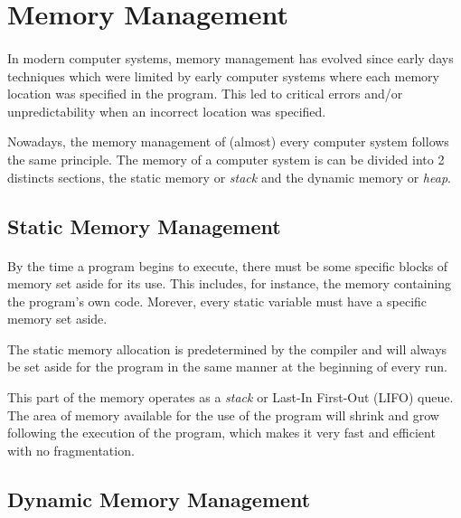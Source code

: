 \section{Memory Management}





\paragraph{}
In modern computer systems, memory management has evolved since early days techniques which were limited
    by early computer systems where each memory location was specified in the program.
This led to critical errors and/or unpredictability when an incorrect location was specified.

Nowadays, the memory management of (almost) every computer system follows the same principle.
The memory of a computer system is can be divided into 2 distincts sections,
    the static memory or \textit{stack} and the dynamic memory or \textit{heap}.

\subsection{Static Memory Management}
\paragraph{}
By the time a program begins to execute, there must be some specific blocks of memory set aside for its use.
This includes, for instance, the memory containing the program's own code.
Morever, every static variable must have a specific memory set aside.

The static memory allocation is predetermined by the compiler
    and will always be set aside for the program in the same manner at the beginning of every run.

This part of the memory operates as a \textit{stack} or Last-In First-Out (LIFO) queue.
The area of memory available for the use of the program will shrink and grow following the execution of the program,
which makes it very fast and efficient with no fragmentation.

\subsection{Dynamic Memory Management}
